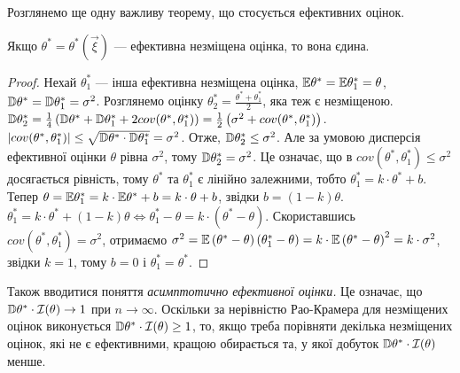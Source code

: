 Розглянемо ще одну важливу теорему, що стосується ефективних оцінок.
\begin{theorem*}
    Якщо $\theta^* = \theta^* (\vec{\xi})$ --- ефективна незміщена оцінка, то вона єдина.
\end{theorem*}
\begin{proof}
    Нехай $\theta_1^*$ --- інша ефективна незміщена оцінка, $\mathbb{E}\theta^* = \mathbb{E}\theta_1^* = \theta$,
    $\mathbb{D}\theta^* = \mathbb{D}\theta_1^* = \sigma^2$. Розглянемо оцінку $\theta_2^* = \frac{\theta^* + \theta_1^*}{2}$, яка теж є незміщеною.
    $\mathbb{D}\theta_2^* = \frac{1}{4}\left(\mathbb{D}\theta^* + \mathbb{D}\theta_1^* + 2{cov}(\theta^*, \theta_1^*) \right) = \frac{1}{2}\left( \sigma^2 + {cov}(\theta^*, \theta_1^*)\right)$.
    $\left|{cov}(\theta^*, \theta_1^*) \right| \leq \sqrt{\mathbb{D}\theta^* \cdot \mathbb{D}\theta_1^*} = \sigma^2$.
    Отже, $\mathbb{D}\theta_2^* \leq \sigma^2$. Але за умовою дисперсія ефективної оцінки $\theta$ рівна $\sigma^2$, тому $\mathbb{D}\theta_2^* = \sigma^2$.
    Це означає, що в ${cov}(\theta^*, \theta_1^*) \leq \sigma^2$ досягається рівність, тому $\theta^*$ та $\theta_1^*$ є лінійно залежними, тобто
    $\theta_1^* = k\cdot \theta^* + b$. Тепер $\theta = \mathbb{E}\theta_1^* = k\cdot \mathbb{E}\theta^* + b = k\cdot \theta + b$, звідки $b = (1-k)\theta$.
    $\theta_1^* = k\cdot \theta^* + (1-k)\theta \Leftrightarrow \theta_1^* - \theta = k \cdot \left(\theta^* - \theta \right)$.
    Скориставшись ${cov}(\theta^*, \theta_1^*) = \sigma^2$, отримаємо 
    $\sigma^2 = \mathbb{E}\left(\theta^* - \theta \right)\left(\theta_1^* - \theta \right) = k \cdot \mathbb{E}\left(\theta^* - \theta \right)^2 = k \cdot \sigma^2$,
    звідки $k = 1$, тому $b = 0$ і $\theta^*_1 = \theta^*$.
\end{proof}

Також вводитися поняття \emph{асимптотично ефективної оцінки.} Це означає, що 
$\mathbb{D}\theta^* \cdot \mathcal{I}(\theta) \to 1$ при $n\to\infty$. Оскільки за нерівністю Рао-Крамера для незміщених оцінок
виконується $\mathbb{D}\theta^* \cdot \mathcal{I}(\theta) \geq 1$, то, якщо треба порівняти декілька незміщених оцінок,
 які не є ефективними, кращою обирається та, у якої добуток $\mathbb{D}\theta^* \cdot \mathcal{I}(\theta)$ менше.

